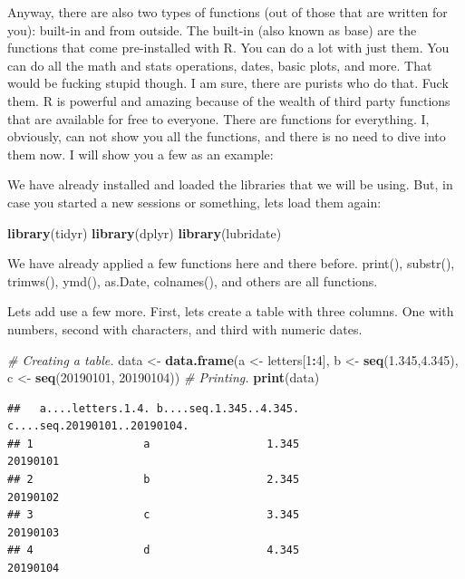 \documentclass[]{book}
\newenvironment{Shaded}{\begin{snugshade}}{\end{snugshade}}
\newcommand{\CommentTok}[1]{\textcolor[rgb]{0.56,0.35,0.01}{\textit{#1}}}
\newcommand{\DecValTok}[1]{\textcolor[rgb]{0.00,0.00,0.81}{#1}}
\newcommand{\FloatTok}[1]{\textcolor[rgb]{0.00,0.00,0.81}{#1}}
\newcommand{\KeywordTok}[1]{\textcolor[rgb]{0.13,0.29,0.53}{\textbf{#1}}}
\newcommand{\NormalTok}[1]{#1}
\newcommand{\OperatorTok}[1]{\textcolor[rgb]{0.81,0.36,0.00}{\textbf{#1}}}
\newcommand{\StringTok}[1]{\textcolor[rgb]{0.31,0.60,0.02}{#1}}
\begin{document}
Anyway, there are also two types of functions (out of those that are written for you): built-in and from outside. The built-in (also known as base) are the functions that come pre-installed with R. You can do a lot with just them. You can do all the math and stats operations, dates, basic plots, and more. That would be fucking stupid though. I am sure, there are purists who do that. Fuck them. R is powerful and amazing because of the wealth of third party functions that are available for free to everyone. There are functions for everything. I, obviously, can not show you all the functions, and there is no need to dive into them now. I will show you a few as an example:

We have already installed and loaded the libraries that we will be using. But, in case you started a new sessions or something, lets load them again:

\begin{Shaded}
\begin{Highlighting}[]
\KeywordTok{library}\NormalTok{(tidyr)}
\KeywordTok{library}\NormalTok{(dplyr)}
\KeywordTok{library}\NormalTok{(lubridate)}
\end{Highlighting}
\end{Shaded}

We have already applied a few functions here and there before. print(), substr(), trimws(), ymd(), as.Date, colnames(), and others are all functions.

Lets add use a few more. First, lets create a table with three columns. One with numbers, second with characters, and third with numeric dates.

\begin{Shaded}
\begin{Highlighting}[]
\CommentTok{# Creating a table.}
\NormalTok{data <-}\StringTok{ }\KeywordTok{data.frame}\NormalTok{(a <-}\StringTok{ }\NormalTok{letters[}\DecValTok{1}\OperatorTok{:}\DecValTok{4}\NormalTok{],}
\NormalTok{                      b <-}\StringTok{ }\KeywordTok{seq}\NormalTok{(}\FloatTok{1.345}\NormalTok{,}\FloatTok{4.345}\NormalTok{),}
\NormalTok{                      c <-}\StringTok{ }\KeywordTok{seq}\NormalTok{(}\DecValTok{20190101}\NormalTok{, }\DecValTok{20190104}\NormalTok{))}
\CommentTok{# Printing.}
\KeywordTok{print}\NormalTok{(data)}
\end{Highlighting}
\end{Shaded}

\begin{verbatim}
##   a....letters.1.4. b....seq.1.345..4.345. c....seq.20190101..20190104.
## 1                 a                  1.345                     20190101
## 2                 b                  2.345                     20190102
## 3                 c                  3.345                     20190103
## 4                 d                  4.345                     20190104
\end{verbatim}
\end{document}
